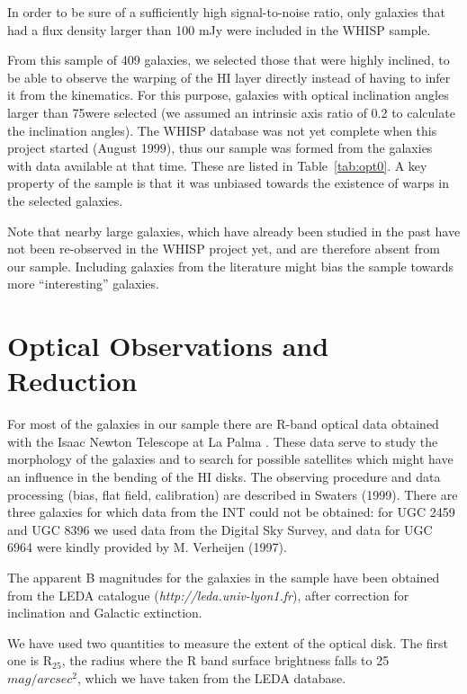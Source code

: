 \documentclass{aa}
\begin{document}
In order to be sure of a sufficiently high signal-to-noise ratio, only
galaxies that had a flux density larger than 100 mJy were included in the
WHISP sample. 

From this sample of 409 galaxies, we selected those that were highly
inclined, to be able to observe the warping of the HI layer directly
instead of having to infer it from the kinematics. For this purpose,
galaxies with optical inclination angles larger than 75\degr were
selected (we assumed an intrinsic axis ratio of 0.2 to calculate the 
inclination angles). The WHISP database was not yet complete when this project
started (August 1999), thus our sample was formed from the galaxies
with data available at that time. These are listed in
Table~\ref{tab:opt0}. A key property of the sample is
that it was unbiased towards the existence of warps in the selected galaxies.

Note that nearby large galaxies, which have already
been studied in the past have not been re-observed in the WHISP
project yet, and are therefore absent from our sample. Including 
galaxies from the literature might bias the sample towards more
``interesting'' galaxies.

\section{Optical Observations and Reduction}

For most of the galaxies in our sample there are R-band optical data
obtained with the Isaac Newton Telescope at La Palma \cite{sm}. These
data serve to study the morphology of the galaxies and
to search for possible satellites which might have an influence in the
bending of the HI disks. The observing procedure and data processing
(bias, flat field, calibration) are described in Swaters
(1999). There are three galaxies for which
data from the INT could not be obtained: for UGC 2459 and UGC 8396 we used
data from the Digital Sky Survey, and data for UGC 6964 were kindly
provided by M. Verheijen (1997).  

The apparent B magnitudes for the galaxies in the sample have been obtained
from the LEDA catalogue ({\em http://leda.univ-lyon1.fr}), after
correction for inclination and Galactic extinction.

\label{ropt}

We have used two quantities to measure the extent of the optical
disk. The first one is R$_{25}$, the radius where the R band surface
brightness falls to 25 $mag/arcsec^2$, which we have taken from the
LEDA database.  
\end{document}
